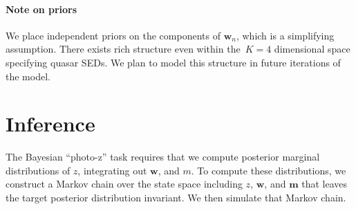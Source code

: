 \documentclass{article}
\begin{document}
\paragraph{Note on priors}
We place independent priors on the components of $\mathbf{w}_n$, which is a simplifying assumption. 
There exists rich structure even within the~${K=4}$ dimensional space specifying quasar SEDs. 
We plan to model this structure in future iterations of the model.  


\begin{table}[t]
\caption{%
Top: mean absolute and mean absolute percentage error of photometric redshift predictions with respect to spectroscopic ``ground truth''.
Bottom: number of predicted values covered by posterior sample quantiles of varying size. }
\label{tab:error}
\vskip 0in
\begin{center}
\begin{small}
\begin{sc}

\end{sc}
\end{small}
\end{center}
\vskip -0.1in
\end{table}


\section{Inference}
\label{sec:inference}
The Bayesian ``photo-z'' task requires that we compute posterior marginal distributions of $z$, integrating out $\mathbf{w}$, and $m$.  
To compute these distributions, we construct a Markov chain over the state space including $z$, $\mathbf{w}$, and $\mathbf{m}$ that leaves the target posterior distribution invariant.
We then simulate that Markov chain.  
 
\end{document}
